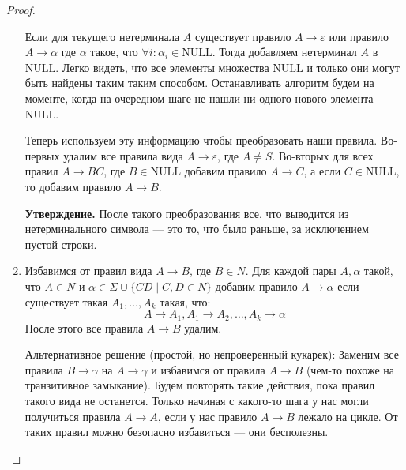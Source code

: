 \begin{proof}
\begin{enumerate}
    Если для текущего нетерминала $A$ существует правило $A \to \varepsilon$ или правило $A \to \alpha$ где $\alpha$ такое, что $\forall i\colon \alpha_i \in \mathrm{NULL}$. Тогда добавляем нетерминал $A$ в $\mathrm{NULL}$. Легко видеть, что все элементы множества $\mathrm{NULL}$ и только они могут быть найдены таким таким способом. 
    Останавливать алгоритм будем на моменте, когда на очередном шаге не нашли ни одного нового элемента $\mathrm{NULL}$.

    Теперь используем эту информацию чтобы преобразовать наши правила. Во-первых удалим все правила вида $A \to \varepsilon$, где $A \neq S$. Во-вторых для всех правил $A \to BC$, где $B \in \mathrm{NULL}$ добавим правило $A \to C$, а если $C \in \mathrm{NULL}$, то добавим правило $A \to B$.

    \textbf{Утверждение.} После такого преобразования все, что выводится из нетерминального символа --- это то, что было раньше, за исключением пустой строки.

    \item Избавимся от правил вида $A \to B$, где $B \in N$. Для каждой пары $A, \alpha$ такой, что $A \in N$ и $\alpha \in \Sigma \cup \{CD \; | \; C, D \in N\}$ добавим правило $A \to \alpha$ если существует такая $A_1, \dotsc, A_k$ такая, что:
    \begin{equation*}
      A \to A_1, A_1 \to A_2, \dotsc, A_k \to \alpha
    \end{equation*}
    После этого все правила $A \to B$ удалим.

    Альтернативное решение (простой, но непроверенный кукарек): 
    Заменим все правила $B \to \gamma$ на $A \to \gamma$ и избавимся от правила $A \to B$ (чем-то похоже на транзитивное замыкание). Будем повторять такие действия, пока правил такого вида не останется. Только начиная с какого-то шага у нас могли получиться правила $A \to A$, если у нас правило $A \to B$ лежало на цикле. От таких правил можно безопасно избавиться --- они бесполезны.
  \end{enumerate}
\end{proof}
